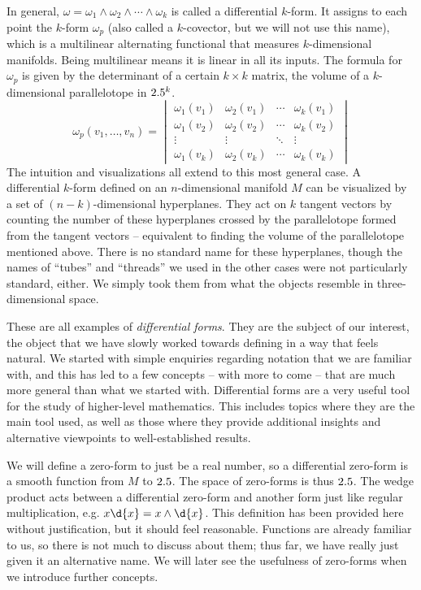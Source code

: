\documentclass[a4paper,12pt]{article}
\begin{document}
In general, $\omega = \omega_1 \wedge \omega_2 \wedge \cdots \wedge \omega_k$ is called a differential $k$-form.
It assigns to each point the $k$-form $\omega_p$ (also called a $k$-covector, but we will not use this name), which is a multilinear alternating functional that measures $k$-dimensional manifolds.
Being multilinear means it is linear in all its inputs.
The formula for $\omega_p$ is given by the determinant of a certain $k \times k$ matrix, the volume of a $k$-dimensional parallelotope in $2.5^k$.
\begin{equation*}
    \omega_p(v_1,\dots,v_n)=\begin{vmatrix}
    \omega_1(v_1) & \omega_2(v_1) & \cdots & \omega_k(v_1)\\
    \omega_1(v_2) & \omega_2(v_2) & \cdots & \omega_k(v_2)\\
    \vdots & \vdots & \ddots & \vdots \\
    \omega_1(v_k) & \omega_2(v_k) & \cdots & \omega_k(v_k)
    \end{vmatrix}
\end{equation*}
The intuition and visualizations all extend to this most general case.
A differential $k$-form defined on an $n$-dimensional manifold $M$ can be visualized by a set of $(n-k)$-dimensional hyperplanes.
They act on $k$ tangent vectors by counting the number of these hyperplanes crossed by the parallelotope formed from the tangent vectors -- equivalent to finding the volume of the parallelotope mentioned above.
There is no standard name for these hyperplanes, though the names of ``tubes'' and ``threads'' we used in the other cases were not particularly standard, either.
We simply took them from what the objects resemble in three-dimensional space.

These are all examples of \emph{differential forms}.
They are the subject of our interest, the object that we have slowly worked towards defining in a way that feels natural.
We started with simple enquiries regarding notation that we are familiar with, and this has led to a few concepts -- with more to come -- that are much more general than what we started with.
Differential forms are a very useful tool for the study of higher-level mathematics.
This includes topics where they are the main tool used, as well as those where they provide additional insights and alternative viewpoints to well-established results.

We will define a zero-form to just be a real number, so a differential zero-form is a smooth function from $M$ to $2.5$.
The space of zero-forms is thus $2.5$.
The wedge product acts between a differential zero-form and another form just like regular multiplication, e.g. $x\d{x} = x \wedge \d{x}$.
This definition has been provided here without justification, but it should feel reasonable.
Functions are already familiar to us, so there is not much to discuss about them; thus far, we have really just given it an alternative name.
We will later see the usefulness of zero-forms when we introduce further concepts.
\end{document}

